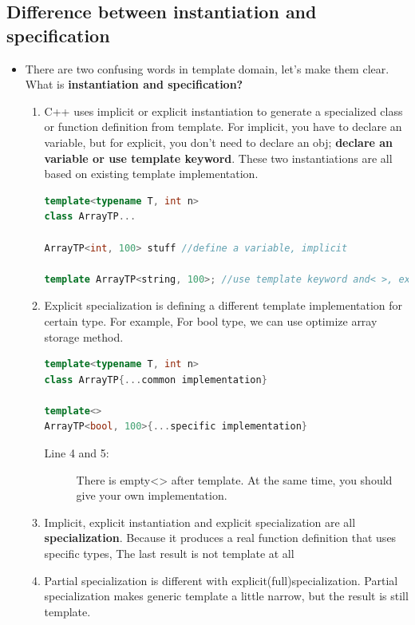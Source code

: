 \documentclass[a4paper,11pt,twoside]{book}
\begin{document}
\subsection{Difference between instantiation and specification}
\begin{itemize}
    \item There are two confusing words in template domain, let's make them clear. What is \textbf{instantiation and specification?}
\begin{enumerate}
	\item C++ uses implicit or explicit instantiation to generate a specialized class or function definition from template. For implicit, you have to declare an variable, but for explicit, you don't need to declare an obj; \textbf{declare an variable or use template keyword}. These two instantiations are all based on existing template implementation.
	
\begin{lstlisting}[frame=single, language=c++]
template<typename T, int n>
class ArrayTP...
	
ArrayTP<int, 100> stuff //define a variable, implicit
	
template ArrayTP<string, 100>; //use template keyword and< >, explicit
\end{lstlisting}

	\item Explicit specialization is defining a different template implementation for certain type. For example, For bool type, we can use optimize array storage method.
\begin{lstlisting}[frame=single, language=c++]
template<typename T, int n>
class ArrayTP{...common implementation}
	
template<>
ArrayTP<bool, 100>{...specific implementation}
\end{lstlisting}
\begin{description}
	\item[Line 4 and 5:] There is empty<> after template. At the same time, you should give your own implementation.
\end{description}
	
	\item Implicit, explicit instantiation and explicit specialization are all \textbf{specialization}. Because it produces a real function definition that uses specific types, The last result is not template at all 
	
	\item Partial specialization is different with explicit(full)specialization. Partial specialization makes generic template a little narrow, but the result is still template. 
	 

\end{enumerate}
\end{itemize}
\end{document}
